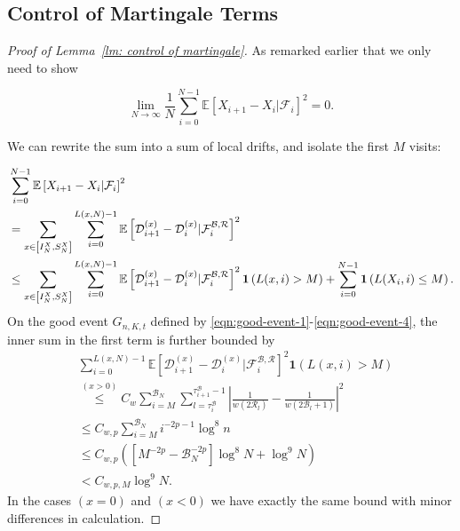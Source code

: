 \documentclass[twoside,12pt, a4paper]{article}
\numberwithin{equation}{section}
\theoremstyle{remark}
\begin{document}
\subsection{Control of Martingale Terms } 
\begin{proof}[Proof of Lemma~\ref{lm: control of martingale}]
	As remarked earlier that we only need to show
	
	\[
	\lim_{N \to \infty } \frac{1}{N} \sum_{i = 0}^{N-1} \mathbb{E}\left[ X_{i+1} - X_i | \mathcal{F}_i \right]^2 = 0
	.\] 
	
	
	We can rewrite the sum into a sum of local drifts, and isolate the first $M$ visits:
	
	\begin{align}
		&\sum_{i = 0}^{N-1} \mathbb{E}\left[ X_{i+1} - X_i | \mathcal{F}_i \right]^2
		\notag
		\\
		&= \sum_{x \in \left[ I_N^X, S_N^X \right]} \sum_{i = 0}^{L(x, N) - 1} \mathbb{E}\left[ \mathcal{D}_{i+1}^{(x)} - \mathcal{D}_i^{(x)} | \mathcal{F}_{i}^{\mathcal{B}, \mathcal{R}} \right]^2  
		\notag
		\\
		&\le  \sum_{x \in \left[ I_N^X, S_N^X \right]} \sum_{i = 0}^{L(x,N) - 1} \mathbb{E}\left[ \mathcal{D}_{i+1}^{(x)} - \mathcal{D}_i^{(x)} | \mathcal{F}_{i}^{\mathcal{B}, \mathcal{R}} \right]^2 \mathbf{1}\left( L(x, i) > M \right) + 
		\sum_{i = 0}^{N - 1} \mathbf{1}\left( L(X_i, i) \le  M \right) 
		\label{eqn:lem-martingale-1}
		.\end{align}
	On the good event $G_{n, K, t}$ defined by \eqref{eqn:good-event-1}-\eqref{eqn:good-event-4},
	the inner sum in the first term is further bounded by
	\begin{align*}
		&\sum_{i =0}^{ L(x, N) - 1} \mathbb{E}\left[ \mathcal{D}_{i+1}^{(x)} - \mathcal{D}_i^{(x)} | \mathcal{F}_{i}^{\mathcal{B}, \mathcal{R}} \right]^2 \mathbf{1}\left( L(x, i) > M \right) \\
		&\stackrel{(x > 0)}{\le} C_w \sum_{i = M}^{\mathcal{B}_N} \sum_{l = \tau_i^{\mathcal{B}}}^{\tau_{i+1}^{\mathcal{B}}-1} 
		\left| \frac{1}{w(2 \mathcal{R}_l)} - \frac{1}{w\left( 2 \mathcal{B}_l + 1 \right) } \right|^2 \\
		&\le C_{w, p} \sum_{i = M}^{\mathcal{B}_N} i^{- 2 p - 1} \log^8 n  \\
		&\le C_{w, p} \left(\left[ M^{- 2 p} - \mathcal{B}_N^{- 2 p} \right] \log^8 N + \log^9 N\right)  \\
		&< C_{w, p, M} \log^9 N
		.
	\end{align*}
	In the cases $(x=0)$ and $(x < 0)$ we have exactly the same bound with minor differences in calculation.
	

\end{proof}
\end{document}
